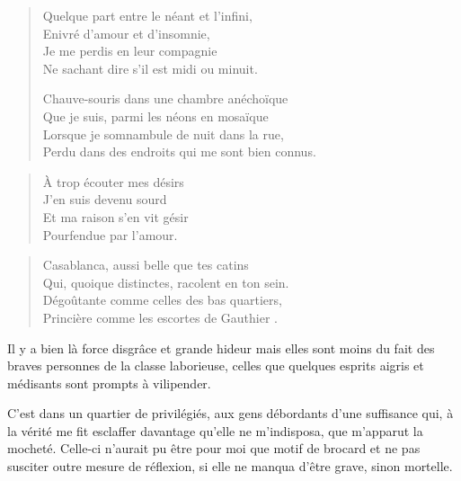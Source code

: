 \begin{verse}\quatrain
  Quelque part entre le néant et l’infini,\\ 
  Enivré d’amour et d’insomnie,\\ 
  Je me perdis en leur compagnie\\ 
  Ne sachant dire s’il est midi ou minuit.  %

  Chauve-souris dans une chambre anéchoïque\\ 
  Que je suis, parmi les néons en mosaïque\\ 
  Lorsque je somnambule de nuit dans la rue,\\ 
  Perdu dans des endroits qui me sont bien connus.  %
\end{verse}

\begin{verse}\quatrain
  À trop écouter mes désirs\\ 
  J’en suis devenu sourd\\ 
  Et ma raison s’en vit gésir\\ 
  Pourfendue par l’amour.  %
\end{verse}

\begin{verse}\quatrain
  Casablanca, aussi belle que tes catins\\ 
  Qui, quoique distinctes, racolent en ton sein.\\ 
  Dégoûtante comme celles des bas quartiers,\\ 
  Princière comme les escortes de Gauthier%
  .
\end{verse}

\begin{prose}
  Il y a bien là force disgrâce et grande hideur mais elles sont moins du fait des braves personnes de la classe laborieuse, celles que quelques esprits aigris et médisants sont prompts à vilipender.

  C’est dans un quartier de privilégiés, aux gens débordants d’une suffisance qui, à la vérité me fit esclaffer davantage qu’elle ne m’indisposa, que m’apparut la mocheté. Celle-ci n’aurait pu être pour moi que motif de brocard et ne pas susciter outre mesure de réflexion, si elle ne manqua d’être grave, sinon mortelle.
\end{prose}

